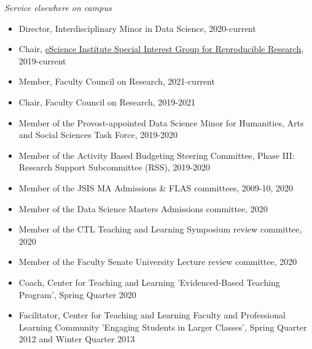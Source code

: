  \medskip
 
 \newpage

\noindent\emph{Service elsewhere on campus\vspace{0.01in}}

\medskip

\begin{itemize}[noitemsep, font=$\bullet$\scshape\bfseries]

\item  Director, Interdisciplinary Minor in Data Science, 2020-current

\item Chair, \href{http://uwescience.github.io/reproducible/}{eScience Institute Special Interest Group for Reproducible Research}, 2019-current

\item  Member, Faculty Council on Research, 2021-current

\item  Chair, Faculty Council on Research, 2019-2021

\item  Member of the Provost-appointed Data Science Minor for Humanities, Arts and Social Sciences Task Force, 2019-2020

\item  Member of the Activity Based Budgeting Steering Committee, Phase III:  Research Support Subcommittee (RSS), 2019-2020

\item  Member of the JSIS MA Admissions \& FLAS committees, 2009-10, 2020

\item  Member of the Data Science Masters Admissions committee, 2020

\item  Member of the CTL Teaching and Learning Symposium review committee, 2020

\item  Member of the Faculty Senate University Lecture review committee, 2020

\item  Coach, Center for Teaching and Learning 'Evidenced-Based Teaching Program', Spring Quarter 2020

\item  Facilitator, Center for Teaching and Learning Faculty and Professional Learning Community 'Engaging Students in Larger Classes', Spring Quarter 2012 and Winter Quarter 2013


\end{itemize}
